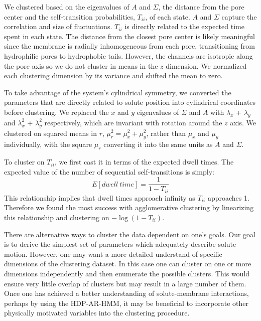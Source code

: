 \documentclass[journal=jpcbfk,manuscript=article]{achemso}
\begin{document}
  We clustered based on the eigenvalues of $A$ and $\Sigma$, the distance from the 
  pore center and the self-transition probabilities, $T_{ii}$, of each state. $A$ 
  and $\Sigma$ capture the correlation and size of fluctuations. $T_{ii}$ is directly
  related to the expected time spent in each state. The distance from the closest pore 
  center is likely meaningful since the membrane is radially inhomogeneous from each 
  pore, transitioning from hydrophilic pores to hydrophobic tails. However, the 
  channels are isotropic along the pore axis so we do not cluster in means in the 
  $z$ dimension. We normalized each clustering dimension by its variance and shifted
  the mean to zero.
  
  To take advantage of the system's cylindrical symmetry, we converted the parameters that
  are directly related to solute position into cylindrical coordinates before clustering. 
  We replaced the $x$ and $y$ eigenvalues of $\Sigma$ and $A$ with $\lambda_x$ + 
  $\lambda_y$ and $\lambda_x^2$ + $\lambda_y^2$ respectively, which are invariant with 
  rotation around the $z$ axis. We clustered on squared means in $r$, 
  $\mu_r^2 = \mu_x^2 + \mu_y^2$, rather than $\mu_x$ and $\mu_y$ individually, with the
  square $\mu_r$ converting it into the same units as $A$ and $\Sigma$.

  To cluster on $T_{ii}$, we first cast it in terms of the expected dwell times. The expected
  value of the number of sequential self-transitions is simply:
  \begin{equation}  
   E[dwell~time] = \frac{1}{1 - T_{ii}}
   \label{eqn:dwell_times}
  \end{equation}  
  This relationship implies that dwell times approach infinity as $T_{ii}$ approaches
  1. Therefore we found the most success with agglomerative clustering by linearizing this
  relationship and clustering on $-\log(1 - T_{ii})$.
  
  There are alternative ways to cluster the data dependent on one's goals. Our goal is
  to derive the simplest set of parameters which adequately describe solute motion. 
  However, one may want a more detailed understand of specific dimensions of the 
  clustering dataset. In this case one can cluster on one or more dimensions independently
  and then enumerate the possible clusters. This would ensure very little overlap of
  clusters but may result in a large number of them. Once one has achieved a better 
  understanding of solute-membrane interactions, perhaps by using the HDP-AR-HMM, it may be
  beneficial to incorporate other physically motivated variables into the clustering
  procedure. 
\end{document}
